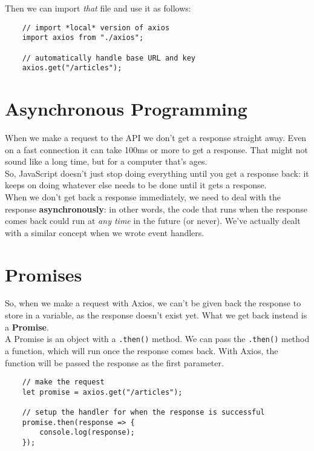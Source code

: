 Then we can import \textit{that} file and use it as follows:

\begin{verbatim}
    // import *local* version of axios
    import axios from "./axios";

    // automatically handle base URL and key
    axios.get("/articles");
\end{verbatim}



\section{Asynchronous Programming}

When we make a request to the API we don't get a response straight away. Even on a fast connection it can take 100ms or more to get a response. That might not sound like a long time, but for a computer that's ages.
\\

So, JavaScript doesn't just stop doing everything until you get a response back: it keeps on doing whatever else needs to be done until it gets a response.
\\

When we don't get back a response immediately, we need to deal with the response \textbf{asynchronously}: in other words, the code that runs when the response comes back could run at \textit{any time} in the future (or never).  We've actually dealt with a similar concept when we wrote event handlers.


\section{Promises}

So, when we make a request with Axios, we can't be given back the response to store in a variable, as the response doesn't exist yet. What we get back instead is a \textbf{Promise}.
\\

A Promise is an object with a \texttt{.then()} method. We can pass the \texttt{.then()} method a function, which will run once the response comes back. With Axios, the function will be passed the response as the first parameter.

\begin{verbatim}
    // make the request
    let promise = axios.get("/articles");

    // setup the handler for when the response is successful
    promise.then(response => {
        console.log(response);
    });
\end{verbatim}

